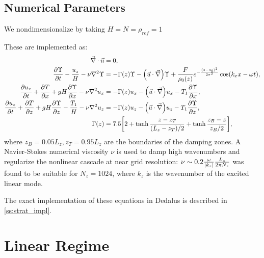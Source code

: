 \documentclass[twocolumn,
        nofootinbib,
        usenames, %
        dvipsnames %
    ]{revtex4-1}%
\newcommand*{\pd}[2]{\frac{\partial#1}{\partial#2}}
\DeclarePairedDelimiter\abs{\lvert}{\rvert}
\DeclarePairedDelimiter\p{\lparen}{\rparen}
\DeclarePairedDelimiter\s{\lbrack}{\rbrack}
\begin{document}
\subsection{Numerical Parameters}\label{ss:numerics}

We nondimensionalize by taking $H = N = \rho_{ref} = 1$

These are implemented as:
\begin{subequations}\label{se:curr_num}
    \begin{align}
        \vec{\nabla} \cdot \vec{u} &= 0,\\
        \pd{\Upsilon}{t} - \frac{u_z}{H}
            - \nu \nabla^2 \Upsilon &= -\Gamma(z) \Upsilon
                - \p*{\vec{u} \cdot \vec{\nabla}}\Upsilon
                + \frac{F}{\rho_0(z)}e^{-\frac{(z - z_0)^2}{2\sigma^2}}
                    \cos \p*{k_xx - \omega t},\\
        \pd{u_x}{t} + \pd{T}{x} + gH\pd{\Upsilon}{x}
            - \nu \nabla^2 u_x
            &= -\Gamma(z) u_x
                - \p*{\vec{u} \cdot \vec{\nabla}}u_x
                - T_1 \pd{\Upsilon}{x},\\
        \pd{u_z}{t} + \pd{T}{z} + gH\pd{\Upsilon}{z} - \frac{T_1}{H}
            - \nu \nabla^2 u_z &= -\Gamma(z) u_z
                - \p*{\vec{u} \cdot \vec{\nabla}}u_z
                - T_1 \pd{\Upsilon}{z},\\
    \Gamma(z) &= 7.5\s*{2 + \tanh \frac{z - z_T}{(L_z - z_T) / 2}
        + \tanh \frac{z_B - z}{z_B / 2}},\label{eq:Gamma}
    \end{align}
\end{subequations}
where $z_B = 0.05L_z, z_T = 0.95L_z$ are the boundaries of the damping zones. A
Navier-Stokes numerical viscosity $\nu$ is used to damp high wavenumbers and
regularize the nonlinear cascade at near grid resolution: $\nu \sim 0.2
\frac{\omega}{\abs*{k_z}}\frac{L_z}{2\pi N_z}$ was found to be suitable for $N_z
= 1024$, where $k_z$ is the wavenumber of the excited linear mode.


The exact implementation of these equations in Dedalus is described in
\autoref{ss:strat_impl}.

\section{Linear Regime}\label{s:lin}
\end{document}
